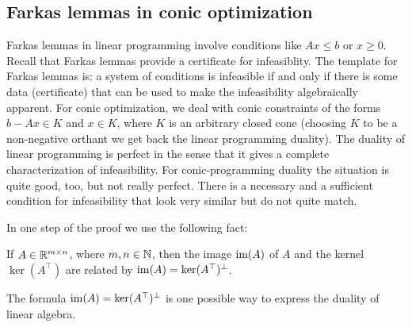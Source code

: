 \subsection{Farkas lemmas in conic optimization}


Farkas lemmas in linear programming involve conditions like $A x \le b$ or $x \ge 0$. Recall that Farkas lemmas provide a certificate for infeasiblity. The template for Farkas lemmas is: a system of conditions is infeasible if and only if there is some data (certificate) that can be used to make the infeasibility algebraically apparent. For conic optimization, we deal with conic constraints of the forms $b - A x \in K$ and $x \in K$, where $K$ is an arbitrary closed cone (choosing $K$ to be a non-negative orthant we get back the linear programming duality). The duality of linear programming is perfect in the sense that it gives a complete characterization of infeasibility. For conic-programming duality the situation is quite good, too, but not really perfect. There is a necessary and a sufficient condition for infeasibility that look very similar but do not quite match. 

In one step of the proof we use the following fact:

\begin{exercise}
If $A \in \mathbb{R}^{m \times n}$, where $m,n \in \mathbb{N}$, then the image $\operatorname{im}(A)$ of $A$ and the kernel $\ker(A^\top)$ are related by $\operatorname{im}(A) = \ker(A^\top)^\perp$. 
\end{exercise}

The formula $\operatorname{im}(A) = \ker(A^\top)^\perp$ is one possible way to express the duality of linear algebra. 
 
